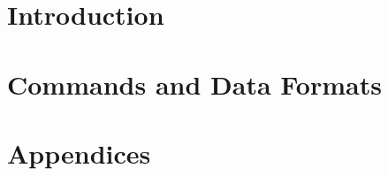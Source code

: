 \documentclass[10pt,openany]{book}
\begin{document}
\pagestyle{plain}

\frontmatter

\tableofcontents

\mainmatter
\part{Introduction}



\part{Commands and Data Formats}





\appendix
\part*{Appendices}





\backmatter 
\end{document}
